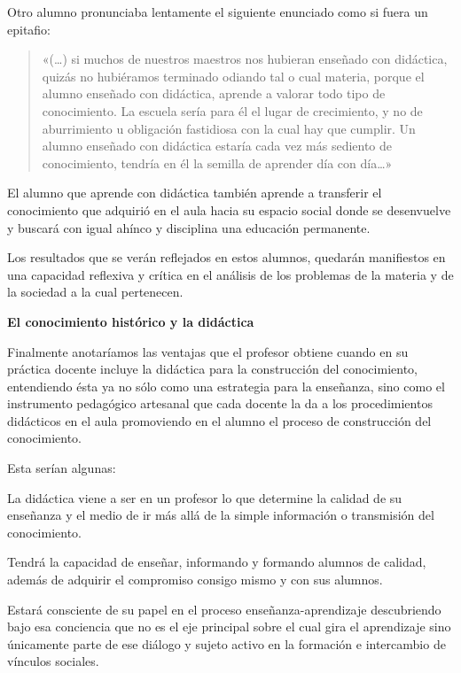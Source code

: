  
Otro alumno pronunciaba lentamente el siguiente enunciado como si fuera 
un epitafio: 

\begin{quotation}
«(\ldots{}) si muchos de nuestros maestros nos hubieran enseñado con 
didáctica, quizás no hubiéramos terminado odiando tal o cual materia, 
porque el alumno enseñado con didáctica, aprende a valorar todo tipo de 
conocimiento. La escuela sería para él el lugar de crecimiento, y no de 
aburrimiento u obligación fastidiosa con la cual hay que cumplir. Un 
alumno enseñado con didáctica estaría cada vez más sediento de 
conocimiento, tendría en él la semilla de aprender día con día\ldots{}»
\end{quotation}
 
El alumno que aprende con didáctica también aprende a transferir el 
conocimiento que adquirió en el aula hacia su espacio social donde se 
desenvuelve y buscará con igual ahínco y disciplina una educación 
permanente.

Los resultados que se verán reflejados en estos alumnos, quedarán 
manifiestos en una capacidad reflexiva y crítica en el análisis de los 
problemas de la materia y de la sociedad a la cual pertenecen.


\medskip
\textbf{El conocimiento histórico y la didáctica}

 
Finalmente anotaríamos las ventajas que el profesor obtiene cuando en 
su práctica docente incluye la didáctica para la construcción del 
conocimiento, entendiendo ésta ya no sólo como una estrategia para la 
enseñanza, sino como el instrumento pedagógico artesanal que cada 
docente la da a los procedimientos didácticos en el aula promoviendo en 
el alumno el proceso de construcción del conocimiento.

 
Esta serían algunas:

 
La didáctica viene a ser en un profesor lo que determine la calidad de 
su enseñanza y el medio de ir más allá de la simple información o 
transmisión del conocimiento.

 
Tendrá la capacidad de enseñar, informando y formando alumnos de 
calidad, además de adquirir el compromiso consigo mismo y con sus 
alumnos.

 
Estará consciente de su papel en el proceso enseñanza-aprendizaje 
descubriendo bajo esa conciencia que no es el eje principal sobre el 
cual gira el aprendizaje sino únicamente parte de ese diálogo y sujeto 
activo en la formación e intercambio de vínculos sociales.

